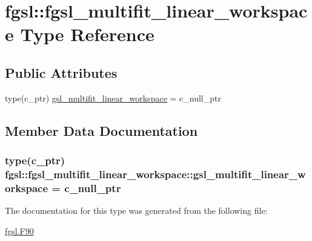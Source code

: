 \hypertarget{structfgsl_1_1fgsl__multifit__linear__workspace}{\section{fgsl\-:\-:fgsl\-\_\-multifit\-\_\-linear\-\_\-workspace Type Reference}
\label{structfgsl_1_1fgsl__multifit__linear__workspace}
}
\subsection*{Public Attributes}
\begin{DoxyCompactItemize}
\item 
type(c\-\_\-ptr) \hyperlink{structfgsl_1_1fgsl__multifit__linear__workspace_ae181de375933a138dd41f225d12b2859}{gsl\-\_\-multifit\-\_\-linear\-\_\-workspace} = c\-\_\-null\-\_\-ptr
\end{DoxyCompactItemize}


\subsection{Member Data Documentation}
\hypertarget{structfgsl_1_1fgsl__multifit__linear__workspace_ae181de375933a138dd41f225d12b2859}{
\subsubsection[{gsl\-\_\-multifit\-\_\-linear\-\_\-workspace}]{\setlength{\rightskip}{0pt plus 5cm}type(c\-\_\-ptr) fgsl\-::fgsl\-\_\-multifit\-\_\-linear\-\_\-workspace\-::gsl\-\_\-multifit\-\_\-linear\-\_\-workspace = c\-\_\-null\-\_\-ptr}}\label{structfgsl_1_1fgsl__multifit__linear__workspace_ae181de375933a138dd41f225d12b2859}


The documentation for this type was generated from the following file\-:\begin{DoxyCompactItemize}
\item 
\hyperlink{fgsl_8F90}{fgsl.\-F90}\end{DoxyCompactItemize}
